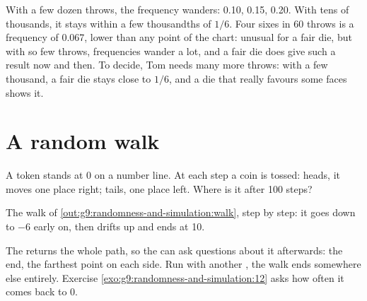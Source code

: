 With a few dozen throws, the frequency wanders: 0.10, 0.15, 0.20. With tens of
thousands, it stays within a few thousandths of $1/6$. Four sixes in 60 throws
is a frequency of 0.067, lower than any point of the chart: unusual for a fair
die, but with so few throws, frequencies wander a lot, and a fair die does give
such a result now and then. To decide, Tom needs many more throws: with a few
thousand, a fair die stays close to $1/6$, and a die that really favours some
faces shows it.

\section{A random walk}

A token stands at 0 on a number line. At each step a coin is tossed: heads, it
moves one place right; tails, one place left. Where is it after 100 steps?

\label{lst:g9:randomness-and-simulation:walk}

\label{out:g9:randomness-and-simulation:walk}

\begin{omfigure}

{\small The walk of \cref{out:g9:randomness-and-simulation:walk}, step by step: it
goes down to $-6$ early on, then drifts up and ends at 10.}
\end{omfigure}

The   returns the whole path, so the  can ask
questions about it afterwards: the end, the farthest point on each side. Run
with another , the walk ends somewhere else entirely. Exercise
\ref{exo:g9:randomness-and-simulation:12} asks how often it comes back to 0.

